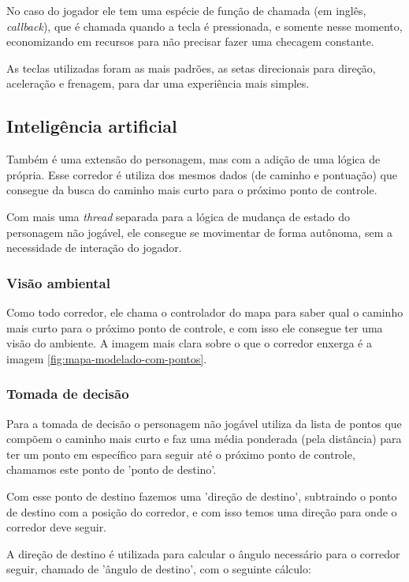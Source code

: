 No caso do jogador ele tem uma espécie de função de chamada (em inglês, \textit{callback}), que é chamada quando a tecla é pressionada, e somente nesse momento, economizando em recursos para não precisar fazer uma checagem constante.

As teclas utilizadas foram as mais padrões, as setas direcionais para direção, aceleração e frenagem, para dar uma experiência mais simples.

\subsection{Inteligência artificial}

Também é uma extensão do personagem, mas com a adição de uma lógica de própria. Esse corredor é utiliza dos mesmos dados (de caminho e pontuação) que consegue da busca do caminho mais curto para o próximo ponto de controle.

Com mais uma \textit{thread} separada para a lógica de mudança de estado do personagem não jogável, ele consegue se movimentar de forma autônoma, sem a necessidade de interação do jogador.

\subsubsection{Visão ambiental}

Como todo corredor, ele chama o controlador do mapa para saber qual o caminho mais curto para o próximo ponto de controle, e com isso ele consegue ter uma visão do ambiente. A imagem mais clara sobre o que o corredor enxerga é a imagem \ref{fig:mapa-modelado-com-pontos}.

\subsubsection{Tomada de decisão}

Para a tomada de decisão o personagem não jogável utiliza da lista de pontos que compõem o caminho mais curto e faz uma média ponderada (pela distância) para ter um ponto em específico para seguir até o próximo ponto de controle, chamamos este ponto de 'ponto de destino'.

Com esse ponto de destino fazemos uma 'direção de destino', subtraindo o ponto de destino com a posição do corredor, e com isso temos uma direção para onde o corredor deve seguir.

A direção de destino é utilizada para calcular o ângulo necessário para o corredor seguir, chamado de 'ângulo de destino', com o seguinte cálculo:

